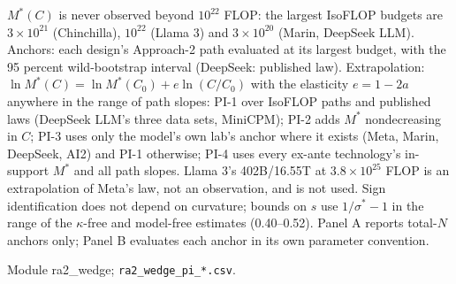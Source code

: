 \begin{table}[tp]
\centering
\caption{Partial Identification of the Compute-Optimal Ratio at Frontier Scale}
\label{tab:ra2-pi}
\footnotesize
\setlength{\tabcolsep}{3pt}
\ifdefined\ratabbox\else\newsavebox{\ratabbox}\fi
{}
\ifdim\wd\ratabbox>\textwidth\resizebox{\textwidth}{!}{\usebox{\ratabbox}}\else\usebox{\ratabbox}\fi\par
\begin{tablenotes}$M^*(C)$ is never observed beyond $10^{22}$ FLOP: the largest IsoFLOP budgets are $3\times10^{21}$ (Chinchilla), $10^{22}$ (Llama 3) and $3\times10^{20}$ (Marin, DeepSeek LLM). Anchors: each design's Approach-2 path evaluated at its largest budget, with the 95 percent wild-bootstrap interval (DeepSeek: published law). Extrapolation: $\ln M^*(C)=\ln M^*(C_0)+e\ln(C/C_0)$ with the elasticity $e=1-2a$ anywhere in the range of path slopes: PI-1 over IsoFLOP paths and published laws (DeepSeek LLM's three data sets, MiniCPM); PI-2 adds $M^*$ nondecreasing in $C$; PI-3 uses only the model's own lab's anchor where it exists (Meta, Marin, DeepSeek, AI2) and PI-1 otherwise; PI-4 uses every ex-ante technology's in-support $M^*$ and all path slopes. Llama 3's 402B/16.55T at $3.8\times10^{25}$ FLOP is an extrapolation of Meta's law, not an observation, and is not used. Sign identification does not depend on curvature; bounds on $s$ use $1/\sigma^*-1$ in the range of the $\kappa$-free and model-free estimates (0.40--0.52). Panel A reports total-$N$ anchors only; Panel B evaluates each anchor in its own parameter convention.\end{tablenotes}
\begin{tablenotes}[Source]Module ra2\_wedge; \texttt{ra2\_wedge\_pi\_*.csv}.\end{tablenotes}
\end{table}
